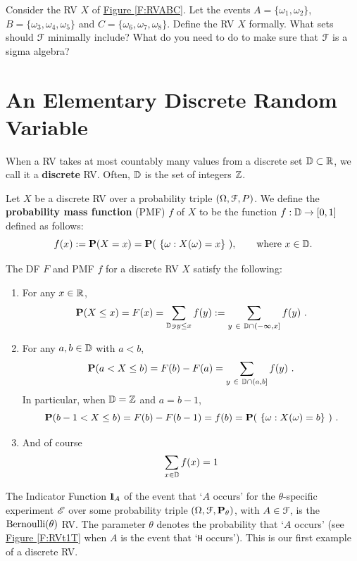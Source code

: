 \begin{classwork}
Consider the RV $X$ of \hyperref[F:RVABC]{Figure \ref*{F:RVABC}}.  Let the events $A = \{\omega_1, \omega_2\}$, $B = \{\omega_3, \omega_4, \omega_5\}$ and $C = \{\omega_6, \omega_7,\omega_8 \}$.  Define the RV $X$ formally.  What sets should $\mathcal{F}$ minimally include?  What do you need to do to make sure that $\mathcal{F}$ is a sigma algebra?
\vspace{4cm}
\end{classwork}

\section{An Elementary Discrete Random Variable}\label{S:ElemDiscRV}

When a RV takes at most countably many values from a discrete set $\mathbb{D} \subset \mathbb{R}$, we call it a {\bf discrete} RV.  Often, $\mathbb{D}$ is the set of integers $\mathbb{Z}$.
\begin{definition}
Let $X$ be a discrete RV over a probability triple $(\Omega, \mathcal{F},P)$.  We define the {\bf probability mass function} (PMF) $f$ of $X$ to be the function $f : \mathbb{D} \rightarrow [0,1]$ defined as follows:
\[
f(x) := \mathbf{P}(X=x) = \mathbf{P}( \ \{\omega: X(\omega) = x\} \ ), \qquad \text{where $x \in \mathbb{D}$.} 
\]
\end{definition}
The DF $F$ and PMF $f$ for a discrete RV $X$ satisfy the following:
\begin{enumerate}
\item  For any $x \in \mathbb{R}$,
\[
\mathbf{P}(X \leq x) = F(x) = \sum_{\mathbb{D} \ni y \leq x} f(y) := 
\sum_{y \ \in \  \mathbb{D} \cap (-\infty, x] } f(y) \ .
\]
\item For any $a,b \in \mathbb{D}$ with $a<b$,
\[
\mathbf{P}(a < X \leq b) = F(b) - F(a) = \sum_{y \ \in \  \mathbb{D} \cap (a, b] } f(y) \ .
\]
In particular, when $\mathbb{D}=\mathbb{Z}$ and $a=b-1$,
\[
\mathbf{P}(b-1 < X \leq b) = F(b) - F(b-1) = f(b) = \mathbf{P}( \ \{ \omega : X(\omega) = b\} \ ) \ .
\]
\item And of course
\[
\sum_{x \in \mathbb{D}} f(x) = 1
\]
\end{enumerate}

The Indicator Function ${1}\mspace{-11 mu}{1}_A$ of the event that `$A$ occurs' for the $\theta$-specific experiment $\mathscr{E}$ over some probability triple $(\Omega,\mathcal{F},\mathbf{P}_{\theta})$, with $A \in \mathcal{F}$, is the $\mbox{{\rm Bernoulli}}(\theta)$ RV.  The parameter $\theta$ denotes the probability that `$A$ occurs' (see \hyperref[F:RVt1T]{Figure \ref*{F:RVt1T}} when $A$ is the event that `{\tt H} occurs').  This is our first example of a discrete RV.

